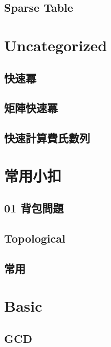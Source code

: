     \subsection{Sparse Table}
        


\section{Uncategorized}
    \subsection{快速冪}
        
    \subsection{矩陣快速冪}
        
    \subsection{快速計算費氏數列}
        


\section{常用小扣}
    \subsection{01 背包問題}
        
    \subsection{Topological}
        
    \subsection{常用}
        


\section{Basic}
    \subsection{GCD}
        
